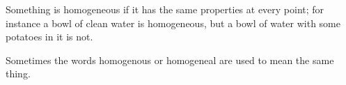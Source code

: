 Something is homogeneous if it has the same properties at every point;
for instance a bowl of clean water is homogeneous, but a bowl of water
with some potatoes in it is not.
\par
Sometimes the words homogenous or homogeneal are used to mean the
same thing.